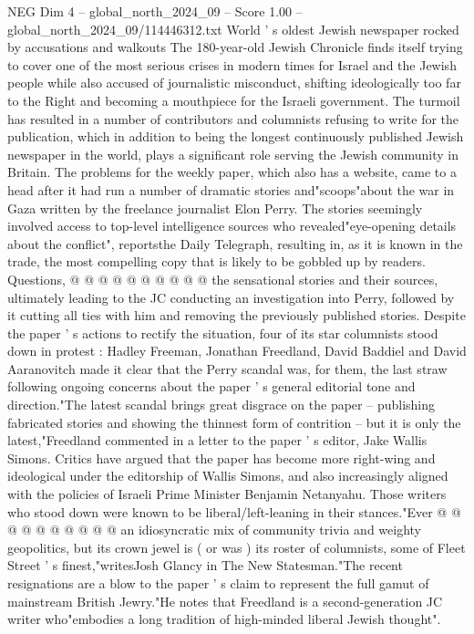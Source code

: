 \begin{textsample}{NEG Dim 4 – global\_north\_2024\_09 – Score 1.00 – global\_north\_2024\_09/114446312.txt}  \label{ex:f4_neg_138}
World ' s oldest Jewish newspaper rocked by accusations and walkouts The 180-year-old Jewish Chronicle finds itself trying to cover one of the most serious crises in modern times for Israel and the Jewish people while also accused of journalistic misconduct, shifting ideologically too far to the Right and becoming a mouthpiece for the Israeli government.
The turmoil has resulted in a number of contributors and columnists refusing to write for the publication, which in addition to being the longest continuously published Jewish newspaper in the world, plays a significant role serving the Jewish community in Britain.
The problems for the weekly paper, which also has a website, came to a head after it had run a number of dramatic stories and"scoops"about the war in Gaza written by the freelance journalist Elon Perry.
The stories seemingly involved access to top-level intelligence sources who revealed"eye-opening details about the conflict", reportsthe Daily Telegraph, resulting in, as it is known in the trade, the most compelling copy that is likely to be gobbled up by readers.
Questions, @ @ @ @ @ @ @ @ @ @ the sensational stories and their sources, ultimately leading to the JC conducting an investigation into Perry, followed by it cutting all ties with him and removing the previously published stories.
Despite the paper ' s actions to rectify the situation, four of its star columnists stood down in protest : Hadley Freeman, Jonathan Freedland, David Baddiel and David Aaranovitch made it clear that the Perry scandal was, for them, the last straw following ongoing concerns about the paper ' s general editorial tone and direction."The latest scandal brings great disgrace on the paper -- publishing fabricated stories and showing the thinnest form of contrition -- but it is only the latest,"Freedland commented in a letter to the paper ' s editor, Jake Wallis Simons.
Critics have argued that the paper has become more right-wing and ideological under the editorship of Wallis Simons, and also increasingly aligned with the policies of Israeli Prime Minister Benjamin Netanyahu.
Those writers who stood down were known to be liberal/left-leaning in their stances."Ever @ @ @ @ @ @ @ @ @ @ an idiosyncratic mix of community trivia and weighty geopolitics, but its crown jewel is ( or was ) its roster of columnists, some of Fleet Street ' s finest,"writesJosh Glancy in The New Statesman."The recent resignations are a blow to the paper ' s claim to represent the full gamut of mainstream British Jewry."He notes that Freedland is a second-generation JC writer who"embodies a long tradition of high-minded liberal Jewish thought".

\end{textsample}
